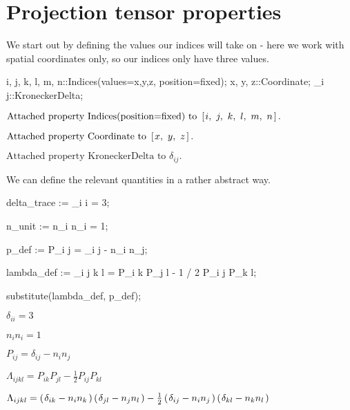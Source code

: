 \documentclass[10pt]{article}
\newcommand\brwrap[3]{%
  \setbox0=\hbox{$#2$}
  \left#1\vbox to \the\ht0{\hbox to 0pt{}}\right.\kern-.2em
  \begingroup #2\endgroup\kern-.15em
  \left.\vbox to \the\ht0{\hbox to 0pt{}}\right#3
}
\begin{document}
\section*{Projection tensor properties}

We start out by defining the values our indices will take on - here we work with spatial coordinates only, so our indices only have three values.
\begin{python}
{i, j, k, l, m, n}::Indices(values={x,y,z}, position=fixed);
{x, y, z}::Coordinate;
{\delta_{i j}}::KroneckerDelta;
\end{python}
\begin{adjustwidth}{1em}{0cm}${}\text{Attached property Indices(position=fixed) to~}\brwrap{[}{i,~ j,~ k,~ l,~ m,~ n}{]}.$\end{adjustwidth}
\begin{adjustwidth}{1em}{0cm}${}\text{Attached property Coordinate to~}\brwrap{[}{x,~ y,~ z}{]}.$\end{adjustwidth}
\begin{adjustwidth}{1em}{0cm}${}\text{Attached property KroneckerDelta to~}\delta_{i j}.$\end{adjustwidth}
We can define the relevant quantities in a rather abstract way.
\begin{python}
delta_trace := \delta_{i i} = 3;

n_unit := n_i n_i = 1;

p_def := P_{i j} = \delta_{i j} - n_i n_j;

lambda_def := \Lambda_{i j k l} = P_{i k} P_{j l} - 1 / 2 P_{i j} P_{k l};

substitute(lambda_def, p_def);
\end{python}
\begin{adjustwidth}{1em}{0cm}${}\delta_{i i} = 3$\end{adjustwidth}
\begin{adjustwidth}{1em}{0cm}${}n_{i} n_{i} = 1$\end{adjustwidth}
\begin{adjustwidth}{1em}{0cm}${}P_{i j} = \delta_{i j}-n_{i} n_{j}$\end{adjustwidth}
\begin{adjustwidth}{1em}{0cm}${}\Lambda_{i j k l} = P_{i k} P_{j l} - \frac{1}{2}P_{i j} P_{k l}$\end{adjustwidth}
\begin{adjustwidth}{1em}{0cm}${}\Lambda_{i j k l} = \brwrap{(}{\delta_{i k}-n_{i} n_{k}}{)} \brwrap{(}{\delta_{j l}-n_{j} n_{l}}{)} - \frac{1}{2}\brwrap{(}{\delta_{i j}-n_{i} n_{j}}{)} \brwrap{(}{\delta_{k l}-n_{k} n_{l}}{)}$\end{adjustwidth}
\end{document}
